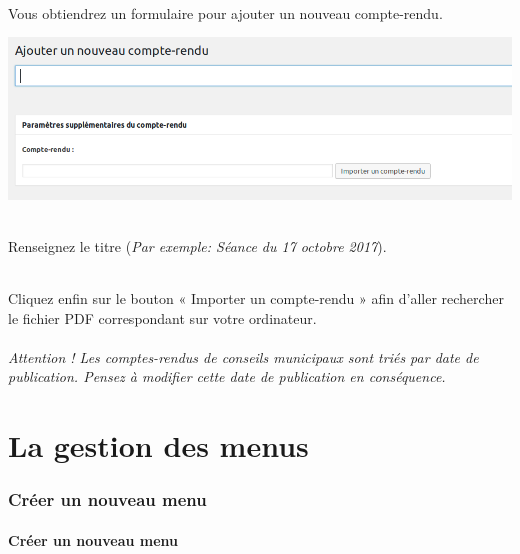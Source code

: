\documentclass[10pt,a4paper]{article}
\begin{document}
\paragraph{}Vous obtiendrez un formulaire pour ajouter un nouveau compte-rendu.
\begin{center}
\includegraphics[scale=0.3]{img/0327.png}
\end{center}
\paragraph{}Renseignez le titre (\textit{Par exemple: Séance du 17 octobre 2017}).
\paragraph{}Cliquez enfin sur le bouton « Importer un compte-rendu » afin d'aller rechercher le fichier PDF correspondant sur votre ordinateur.
\paragraph{Attention ! Les comptes-rendus de conseils municipaux sont triés par date de publication. Pensez à modifier cette date de publication en conséquence.}
\newpage

\part{La gestion des menus}
\newpage
\section{Créer un nouveau menu}
\subsection{Créer un nouveau menu}
\end{document}
